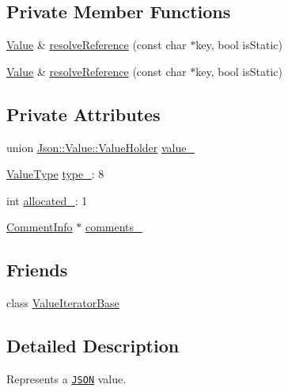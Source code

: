 \subsection*{Private Member Functions}
\begin{DoxyCompactItemize}
\item 
\hyperlink{classJson_1_1Value}{Value} \& \hyperlink{classJson_1_1Value_abce9c8d6434b2da2f720598851f65a4a}{resolve\-Reference} (const char $\ast$key, bool is\-Static)
\item 
\hyperlink{classJson_1_1Value}{Value} \& \hyperlink{classJson_1_1Value_abce9c8d6434b2da2f720598851f65a4a}{resolve\-Reference} (const char $\ast$key, bool is\-Static)
\end{DoxyCompactItemize}
\subsection*{Private Attributes}
\begin{DoxyCompactItemize}
\item 
union \hyperlink{unionJson_1_1Value_1_1ValueHolder}{Json\-::\-Value\-::\-Value\-Holder} \hyperlink{classJson_1_1Value_a692277d820a4750e01354e16a465ecfe}{value\-\_\-}
\item 
\hyperlink{namespaceJson_a7d654b75c16a57007925868e38212b4e}{Value\-Type} \hyperlink{classJson_1_1Value_abd222c2536dc88bf330dedcd076d2356}{type\-\_\-}\-: 8
\item 
int \hyperlink{classJson_1_1Value_af728318d6cfa3e93dcc554d821447646}{allocated\-\_\-}\-: 1
\item 
\hyperlink{structJson_1_1Value_1_1CommentInfo}{Comment\-Info} $\ast$ \hyperlink{classJson_1_1Value_ac6b962f72746177719ed5754dd639d6f}{comments\-\_\-}
\end{DoxyCompactItemize}
\subsection*{Friends}
\begin{DoxyCompactItemize}
\item 
class \hyperlink{classJson_1_1Value_a6bd095e101a936fb8db492964a15263d}{Value\-Iterator\-Base}
\end{DoxyCompactItemize}


\subsection{Detailed Description}
Represents a \href{http://www.json.org}{\tt J\-S\-O\-N} value. 

